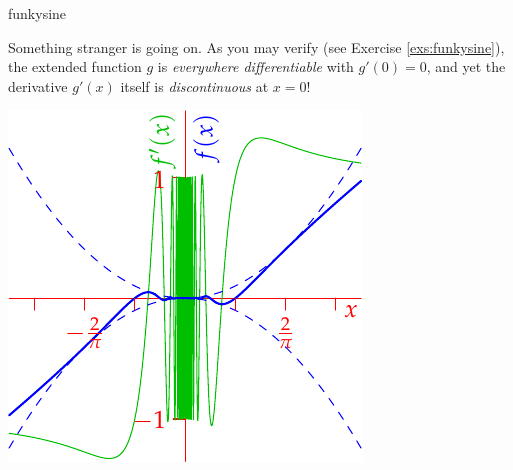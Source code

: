 \begin{examples}{}{funkysine}
\begin{enumerate}
\begin{minipage}[t]{0.6\linewidth}
			Something stranger is going on. As you may verify (see Exercise \ref{exs:funkysine}), the extended function $g$ is \emph{everywhere differentiable} with $g'(0)=0$, and yet the derivative $g'(x)$ itself is \emph{discontinuous} at $x=0$!
		\end{minipage}
		\hfill
		\begin{minipage}[t]{0.39\linewidth}\vspace{-5pt}
			\flushright\includegraphics[scale=0.95]{unifcontex1}
		\end{minipage}
	\end{enumerate}
\end{examples}

\clearpage


\goodbreak


